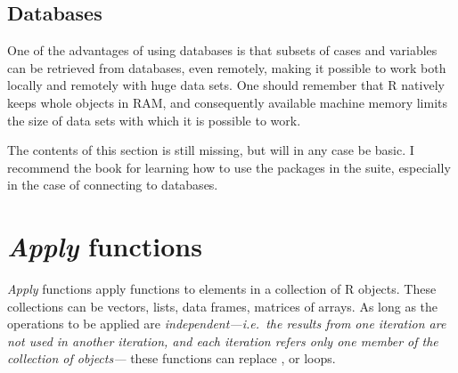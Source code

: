 \documentclass[krantz2,ChapterTOCs]{krantz}\usepackage{knitr}
\begin{document}
\subsection{Databases}\label{sec:data:db}

One of the advantages of using databases is that subsets of cases and variables can be retrieved from databases, even remotely, making it possible to work both locally and remotely with huge data sets. One should remember that R natively keeps whole objects in RAM, and consequently available machine memory limits the size of data sets with which it is possible to work.

\begin{infobox}
The contents of this section is still missing, but will in any case be basic. I recommend the book  \autocite{Wickham2017} for learning how to use the packages in the  suite, especially in the case of connecting to databases.
\end{infobox}

\section[Apply functions]{\emph{Apply} functions}\label{sec:data:apply}

\emph{Apply} functions apply functions to elements in a collection of R objects. These collections can be vectors, lists, data frames, matrices of arrays. As long as the operations to be applied are \emph{independent---i.e.\ the results from one iteration are not used in another iteration, and each iteration refers only one member of the collection of objects---} these functions can replace ,  or  loops.
\end{document}
